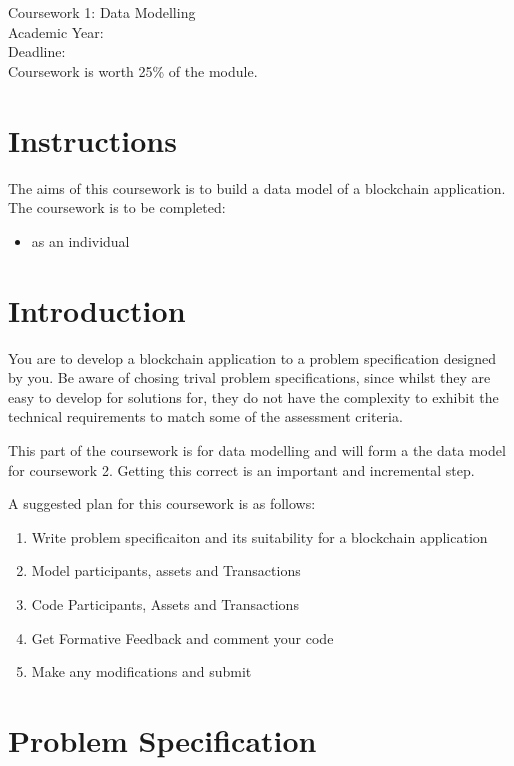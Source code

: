 \Large{\moduleCode\\
\moduleTitle\\
Coursework 1: Data Modelling\\
Academic Year: \academicyear \\
Deadline: \cwideadline \\
Coursework is worth 25\% of the module.}
\normalsize

\section{Instructions}
The aims of this coursework is to build a data model of a blockchain application. The coursework is to be completed:
\begin{itemize}
\item as an individual
\end{itemize}

\section{Introduction}\label{sec:intro}
You are to develop a blockchain application to a problem specification designed by you. Be aware of chosing trival problem specifications, since whilst they are easy to develop for solutions for, they do not have the complexity to exhibit the technical requirements to match some of the assessment criteria.

This part of the coursework is for data modelling and will form a the data model for coursework 2. Getting this correct is an important and incremental step.

A suggested plan for this coursework is as follows:
\begin{enumerate}
	\item Write problem specificaiton and its suitability for a blockchain application
	\item Model participants, assets and Transactions
	\item Code Participants, Assets and Transactions
	\item Get Formative Feedback and comment your code
	\item Make any modifications and submit
\end{enumerate}

\section{Problem Specification}\label{sec:intro}

